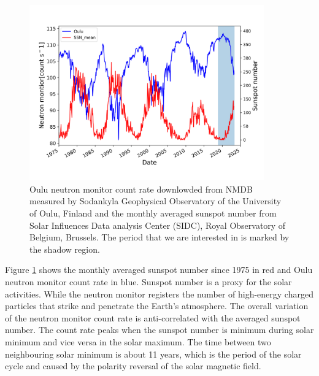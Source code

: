 \begin{figure}[htbp]
	\centering
	\includegraphics[width = 0.9\textwidth]{images/Solar_modulation.png}
	\caption[Sunspot number and Neutron monitor count data]{Oulu neutron monitor count rate downlowded from \ac{NMDB} measured by Sodankyla Geophysical Observatory of the University of Oulu, Finland and the monthly averaged sunspot number from Solar Influences Data analysis Center (SIDC), Royal Observatory of Belgium, Brussels. The period that we are interested in is marked by the shadow region.}
	\label{Fig:Solar_modulation}
\end{figure}


Figure \ref{Fig:Solar_modulation} shows the monthly averaged sunspot number since 1975 in red and Oulu neutron monitor count rate in blue.
Sunspot number is a proxy for the solar activities. While the neutron monitor registers the number of high-energy charged particles that strike and penetrate the Earth's atmosphere. The overall variation of the neutron monitor count rate is anti-correlated with the averaged sunspot number.
The count rate peaks when the sunspot number is minimum during solar minimum and vice versa in the solar maximum. The time between two neighbouring solar minimum is about 11 years, which is the period of the solar cycle and caused by the polarity reversal of the solar magnetic field.

